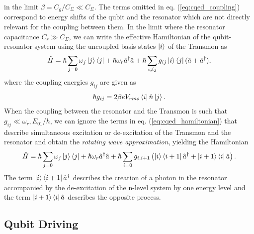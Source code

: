 %
in the limit $\beta = C_g/C_\Sigma \ll C_\Sigma$. The terms omitted in eq. (\ref{eq:cqed_coupling}) correspond to energy shifts of the qubit and the resonator which are not directly relevant for the coupling between them. 
 In the limit where the resonator capacitance $C_r \gg C_\Sigma$, we can write the effective Hamiltonian of the qubit-resonator system using the uncoupled basis states $\left| i \right>$ of the Transmon as
%
\begin{equation}
\hat{H} = \hbar \sum\limits_{j=0} \omega_j \left| j \right>\left< j \right| + \hbar \omega_r \hat{a}^\dagger \hat{a} + \hbar \sum\limits_{i\ne j} g_{ij} \left| i \right>\left< j \right|(\hat{a}+\hat{a}^\dagger), \label{eq:cqed_hamiltonian}
\end{equation}
%
where the coupling energies $g_{ij}$ are given as
%
\begin{equation}
\hbar g_{ij} = 2\beta e V_{rms} \left< i \right|\hat{n}\left| j \right>. \label{eq:qubit_bus_coupling}
\end{equation}
%
When the coupling between the resonator and the Transmon is such that $g_{ij} \ll \omega_r,E_{01}/h$, we can ignore the terms in eq. (\ref{eq:cqed_hamiltonian}) that describe simultaneous excitation or de-excitation of the Transmon and the resonator and obtain the {\it rotating wave approximation}, yielding the Hamiltonian
%
\begin{equation}
\hat{H} = \hbar \sum\limits_{j=0} \omega_j \left| j \right>\left< j \right|+\hbar \omega_r \hat{a}^\dagger \hat{a} + \hbar \sum\limits_{i=0} g_{i,i+1}\left(\left| i \right>\left< i+1 \right|\hat{a}^\dagger +\left| i+1 \right>\left< i \right|\hat{a}\right). \label{eq:cqed_rotating_wave}
\end{equation}
%
The term $\left| i \right>\left< i+1 \right|\hat{a}^\dagger$ describes the creation of a photon in the resonator accompanied by the de-excitation of the n-level system by one energy level and the term $\left| i+1 \right>\left< i \right|\hat{a}$ describes the opposite process.

\subsection{Qubit Driving}

